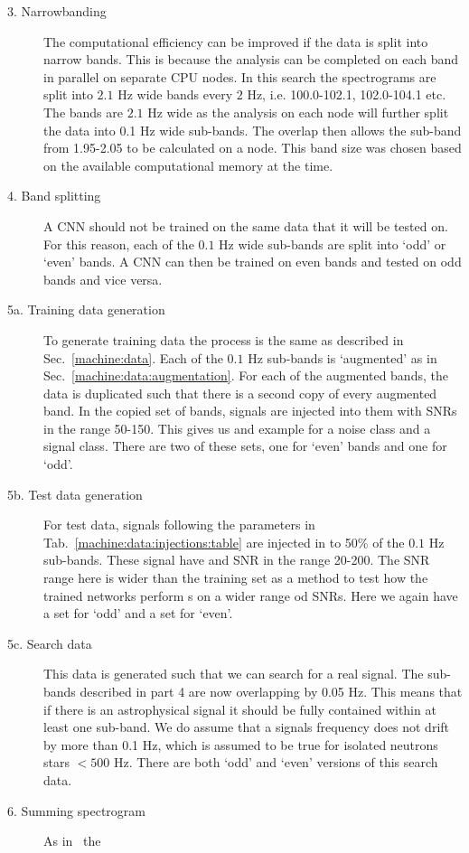 \begin{description}
	\item[3. Narrowbanding] The computational efficiency can be improved if the data is split into narrow bands.
	This is because the analysis can be completed on each band in parallel on separate CPU nodes. 
	In this search the spectrograms are split into $2.1$ Hz wide bands every $2$ Hz, i.e.
	100.0-102.1, 102.0-104.1 etc. The bands are $2.1$ Hz wide as the analysis on each node will further split the data into 0.1 Hz wide sub-bands. 
	The overlap then allows the sub-band from 1.95-2.05 to be calculated on a node.
	This band size was chosen based on the available
	computational memory at the time. 
	\item[4. Band splitting] A \gls{CNN} should not be trained on the same
	data that it will be tested on.
	For this reason, each of the $0.1$ Hz wide sub-bands are split
	into `odd' or `even' bands. A \gls{CNN} can then be trained on even bands and tested on odd bands and vice versa.
	\item[5a. Training data generation] To generate training data the process is
	the same as described in Sec.~\ref{machine:data}. Each of the $0.1$ Hz sub-bands is
	`augmented' as in Sec.~\ref{machine:data:augmentation}. For each of the augmented
	bands, the data is duplicated such that there is a second copy of every augmented band. 
	In the copied set of bands, signals are injected into them with
	\glspl{SNR} in the range 50-150. This gives us and example for a noise class and
	a signal class. There are two of these sets, one for `even' bands and
	one for `odd'.
	\item[5b. Test data generation] For test data, signals following the parameters in
	Tab.~\ref{machine:data:injections:table} are injected in to 50\% of the $0.1$ Hz
	sub-bands. These signal have and \gls{SNR} in the range 20-200. The \gls{SNR} range here is wider than the training set as a method to test how the trained networks perform s on a wider range od \glspl{SNR}. Here we again have a
	set for `odd' and a set for `even'.
	\item[5c. Search data] This data is generated such that we can search for a
	real signal. The sub-bands described in part 4 are now overlapping by 0.05 Hz.
	This means that if there is an astrophysical signal it should be fully contained within at
	least one sub-band. We do assume that a signals frequency does not drift by more than 0.1 Hz, which is assumed to be true for isolated neutrons stars $< 500$ Hz.  There are both `odd' and `even' versions of this search data.
	\item[6. Summing spectrogram] As in~\cite{bayley2019SOAPGeneralised} the

\end{description}
